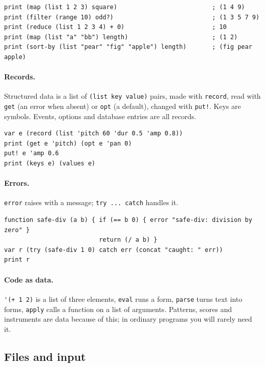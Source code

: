 \documentclass[11pt,a4paper]{article}
\newcommand{\musil}[1]{\lstinline[style=musilinline]{#1}}
\begin{document}
\begin{lstlisting}
print (map (list 1 2 3) square)                          ; (1 4 9)
print (filter (range 10) odd?)                           ; (1 3 5 7 9)
print (reduce (list 1 2 3 4) + 0)                        ; 10
print (map (list "a" "bb") length)                       ; (1 2)
print (sort-by (list "pear" "fig" "apple") length)       ; (fig pear apple)
\end{lstlisting}

\paragraph{Records.} Structured data is a list of \musil{(list key value)} pairs, made with
\musil{record}, read with \musil{get} (an error when absent) or \musil{opt} (a default),
changed with \musil{put!}. Keys are symbols. Events, options and database entries are all
records.

\begin{lstlisting}
var e (record (list 'pitch 60 'dur 0.5 'amp 0.8))
print (get e 'pitch) (opt e 'pan 0)
put! e 'amp 0.6
print (keys e) (values e)
\end{lstlisting}

\paragraph{Errors.} \musil{error} raises with a message; \musil{try ... catch} handles it.

\begin{lstlisting}
function safe-div (a b) { if (== b 0) { error "safe-div: division by zero" }
                          return (/ a b) }
var r (try (safe-div 1 0) catch err (concat "caught: " err))
print r
\end{lstlisting}

\paragraph{Code as data.} \musil{'(+ 1 2)} is a list of three elements, \musil{eval} runs a
form, \musil{parse} turns text into forms, \musil{apply} calls a function on a list of
arguments. Patterns, scores and instruments are data because of this; in ordinary programs
you will rarely need it.

\subsection{Files and input}
\end{document}

